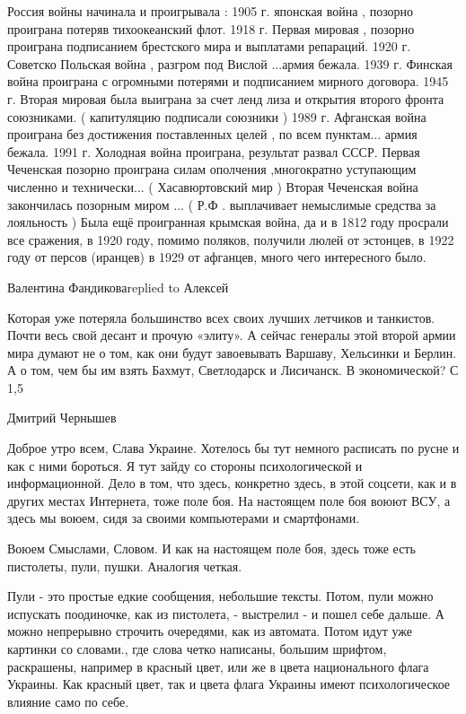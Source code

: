 Россия войны начинала и проигрывала :
1905 г. японская война , позорно проиграна потеряв тихоокеанский флот.
1918 г. Первая мировая , позорно проиграна подписанием брестского мира и выплатами репараций.
1920 г. Советско Польская война , разгром под Вислой ...армия бежала.
1939 г. Финская война проиграна с огромными потерями и подписанием мирного договора.
1945 г. Вторая мировая была выиграна за счет ленд лиза и открытия второго фронта союзниками. ( капитуляцию подписали союзники )
1989 г. Афганская война проиграна без достижения поставленных целей , по всем пунктам... армия бежала.
1991 г. Холодная война проиграна, результат развал СССР.
Первая Чеченская позорно проиграна силам ополчения ,многократно уступающим численно и технически... ( Хасавюртовский мир )
Вторая Чеченская война закончилась позорным миром ... ( Р.Ф . выплачивает немыслимые средства за лояльность )
Была ещё проигранная крымская война, да и в 1812 году просрали все сражения, в 1920 году, помимо поляков, получили люлей от эстонцев, в 1922 году от персов (иранцев) в 1929 от афганцев, много чего интересного было.

Валентина Фандиковаreplied to Алексей

Которая уже потеряла большинство всех своих лучших летчиков и танкистов. Почти весь свой десант и прочую «элиту». А сейчас генералы этой второй армии мира думают не о том, как они будут завоевывать Варшаву, Хельсинки и Берлин. А о том, чем бы им взять Бахмут, Светлодарск и Лисичанск. В экономической? С 1,5%

Дмитрий Чернышев

Доброе утро всем, Слава Украине. Хотелось бы тут немного расписать по русне и
как с ними бороться.  Я тут зайду со стороны психологической и информационной.
Дело в том, что
здесь, конкретно здесь, в этой соцсети, как и в других местах Интернета, тоже
поле боя. На настоящем поле боя воюют ВСУ, а здесь мы воюем, сидя за своими компьютерами и смартфонами.

Воюем Смыслами, Словом. И как на настоящем поле боя, здесь тоже есть пистолеты, пули, пушки. Аналогия четкая.

Пули - это простые едкие сообщения, небольшие тексты. Потом, пули можно
испускать поодиночке, как из пистолета, - выстрелил - и пошел себе дальше. А
можно непрерывно строчить очередями, как из автомата.  Потом идут уже картинки
со словами., где слова четко написаны, большим шрифтом, раскрашены, например в
красный цвет, или же в цвета национального флага Украины. Как красный цвет, так
и цвета флага Украины имеют психологическое влияние само по себе.

